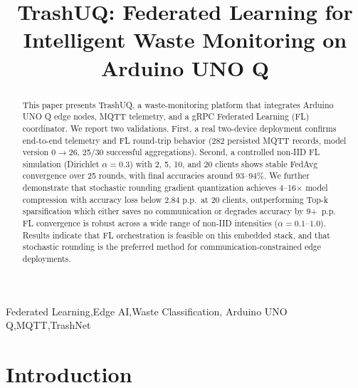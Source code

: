 \documentclass{IOS-Book-Article}
\begin{document}
\pagestyle{headings}
\def\thepage{}
\begin{frontmatter}

\title{TrashUQ: Federated Learning for Intelligent Waste Monitoring on Arduino UNO Q}

\markright{}{}

\author[a]{ }
\author[A]{ }
\author[A]{ }
\author[A]{ }


\address[A]{Universitat de Lleida, Lleida, Catalonia}

\begin{abstract}
This paper presents TrashUQ, a waste-monitoring platform that integrates Arduino UNO Q edge nodes, MQTT telemetry, and a gRPC Federated Learning (FL) coordinator. We report two validations. First, a real two-device deployment confirms end-to-end telemetry and FL round-trip behavior (282 persisted MQTT records, model version 0$\rightarrow$26, 25/30 successful aggregations). Second, a controlled non-IID FL simulation (Dirichlet $\alpha=0.3$) with 2, 5, 10, and 20 clients shows stable FedAvg convergence over 25 rounds, with final accuracies around 93--94\%. We further demonstrate that stochastic rounding gradient quantization achieves 4--16$\times$ model compression with accuracy loss below 2.84 p.p.\ at 20 clients, outperforming Top-k sparsification which either saves no communication or degrades accuracy by 9+~p.p. FL convergence is robust across a wide range of non-IID intensities ($\alpha = 0.1$--$1.0$). Results indicate that FL orchestration is feasible on this embedded stack, and that stochastic rounding is the preferred method for communication-constrained edge deployments.
\end{abstract}

\begin{keyword}
Federated Learning\sep Edge AI\sep Waste Classification\sep
Arduino UNO Q\sep MQTT\sep TrashNet
\end{keyword}
\end{frontmatter}

\section{Introduction}
\label{sec:introduction}

\end{document}
